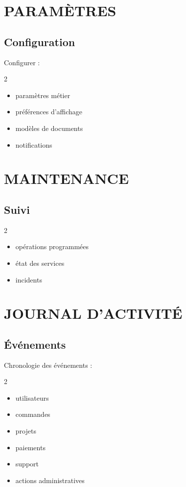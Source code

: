 \documentclass[12pt,a4paper,oneside]{book}
\begin{document}
\chapter{PARAMÈTRES}

\section{Configuration}
Configurer :
\begin{multicols}{2}
\begin{itemize}
\item paramètres métier
\item préférences d'affichage
\item modèles de documents
\item notifications
\end{itemize}
\end{multicols}

\chapter{MAINTENANCE}

\section{Suivi}
\begin{multicols}{2}
\begin{itemize}
\item opérations programmées
\item état des services
\item incidents
\end{itemize}
\end{multicols}

\chapter{JOURNAL D'ACTIVITÉ}

\section{Événements}
Chronologie des événements :
\begin{multicols}{2}
\begin{itemize}
\item utilisateurs
\item commandes
\item projets
\item paiements
\item support
\item actions administratives
\end{itemize}
\end{multicols}
\end{document}
